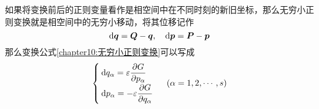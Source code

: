 

如果将变换前后的正则变量看作是相空间中在不同时刻的新旧坐标，那么无穷小正则变换就是相空间中的无穷小移动，将其位移记作
\begin{equation}
	\mathrm{d} \boldsymbol{q} = \boldsymbol{Q}-\boldsymbol{q},\quad \mathrm{d} \boldsymbol{p} = \boldsymbol{P}-\boldsymbol{p}
\end{equation}
那么变换公式\eqref{chapter10:无穷小正则变换}可以写成
\begin{equation}
\begin{cases}
	\mathrm{d} q_\alpha = \varepsilon\dfrac{\partial G}{\partial p_\alpha} \\[1.5ex]
	\mathrm{d} p_\alpha = -\varepsilon\dfrac{\partial G}{\partial q_\alpha}
\end{cases}\,\, (\alpha=1,2,\cdots,s)
\label{chapter10:系统运动观点下的无穷小正则变换}
\end{equation}

